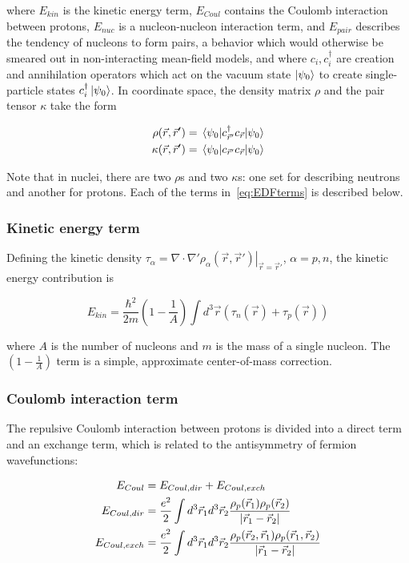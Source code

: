 \noindent where $E_{kin}$ is the kinetic energy term, $E_{Coul}$ contains the Coulomb interaction between protons, $E_{nuc}$ is a nucleon-nucleon interaction term, and $E_{pair}$ describes the tendency of nucleons to form pairs, a behavior which would otherwise be smeared out in non-interacting mean-field models, and where $c_i, c_i^\dagger$ are creation and annihilation operators which act on the vacuum state $\ket{\psi_0}$ to create single-particle states $c_i^\dagger\ket{\psi_0}$. In coordinate space, the density matrix $\rho$ and the pair tensor $\kappa$ take the form

\begin{align}
\rho(\vec{r},\vec{r}') &= \expval{c_{\vec{r}'}^\dagger c_{\vec{r}}}{\psi_0} \\
\kappa(\vec{r},\vec{r}') &= \expval{c_{\vec{r}'} c_{\vec{r}}}{\psi_0}
\end{align}

\noindent Note that in nuclei, there are two $\rho$s and two $\kappa$s: one set for describing neutrons and another for protons. Each of the terms in~\eqref{eq:EDFterms} is described below.

\subsubsection{Kinetic energy term}

Defining the kinetic density $\tau_\alpha = \left.\nabla\cdot\nabla'\rho_\alpha(\vec{r},\vec{r}')\right|_{\vec{r}=\vec{r}'}$, $\alpha=p,n$, the kinetic energy contribution is

\begin{equation}
E_{kin} = \frac{\hbar^2}{2m} \left(1-\frac{1}{A}\right) \int d^3\vec{r} \left(\tau_n(\vec{r}) + \tau_p(\vec{r}) \right)
\end{equation}

\noindent where $A$ is the number of nucleons and $m$ is the mass of a single nucleon. The $\left(1-\frac{1}{A}\right)$ term is a simple, approximate center-of-mass correction.

\subsubsection{Coulomb interaction term}
The repulsive Coulomb interaction between protons is divided into a direct term and an exchange term, which is related to the antisymmetry of fermion wavefunctions:

\begin{align}
E_{Coul} &= E_{Coul, dir} + E_{Coul, exch} \\
E_{Coul, dir}& = \frac{e^2}{2} \int d^3\vec{r}_1 d^3\vec{r}_2 \frac{\rho_p(\vec{r}_1)\rho_p(\vec{r}_2)}{\abs{\vec{r}_1-\vec{r}_2}} \\
E_{Coul, exch} &= \frac{e^2}{2} \int d^3\vec{r}_1 d^3\vec{r}_2 \frac{\rho_p(\vec{r}_2,\vec{r}_1)\rho_p(\vec{r}_1,\vec{r}_2)}{\abs{\vec{r}_1-\vec{r}_2}}
\end{align}

